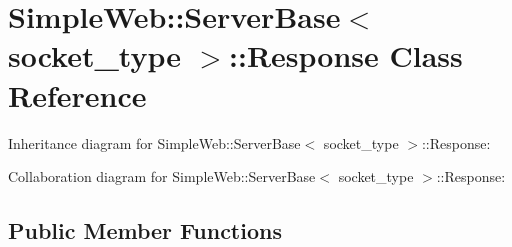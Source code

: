 \hypertarget{classSimpleWeb_1_1ServerBase_1_1Response}{}\section{Simple\+Web\+:\+:Server\+Base$<$ socket\+\_\+type $>$\+:\+:Response Class Reference}
\label{classSimpleWeb_1_1ServerBase_1_1Response}


Inheritance diagram for Simple\+Web\+:\+:Server\+Base$<$ socket\+\_\+type $>$\+:\+:Response\+:


Collaboration diagram for Simple\+Web\+:\+:Server\+Base$<$ socket\+\_\+type $>$\+:\+:Response\+:
\subsection*{Public Member Functions}
